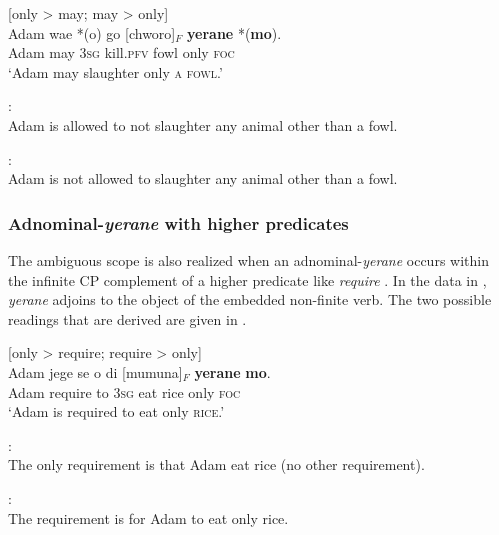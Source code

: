 \documentclass[output=paper,colorlinks,citecolor=brown,draftmode
]{langscibook}
\begin{document}
\ea	 \label{ex:Aremu:Kasem split-scope} [only > may; may > only] \\
\gll Adam wae *(o) go [chworo]$_F$ \textbf{yerane} *(\textbf{mo}).\\
	Adam may 3\textsc{sg} kill.\textsc{pfv} fowl only \textsc{foc}\\
\glt `Adam may slaughter only \textsc{a fowl}.'
\z

\ea \label{ex:Aremu:Kasem split-scope readings}
\begin{xlist}
: \\ Adam is allowed to not slaughter any animal other than a fowl.

: \\ Adam is not allowed to slaughter any animal other than a fowl.
\end{xlist}

\z

\subsubsection{Adnominal-\textit{yerane} with higher predicates}
The ambiguous scope is also realized when an adnominal-\textit{yerane} occurs within the infinite CP complement of a higher predicate like \textit{require} \citep[à la][]{taglicht1984message}. In the data in , \textit{yerane} adjoins to the object of the embedded non-finite verb. The two possible readings that are derived are given in .

\ea \label{ex:Aremu:split-scope with higher predicate} [only > require; require > only] \\
\gll Adam jege se o di [mumuna]$_F$ \textbf{yerane} \textbf{mo}.\\
	Adam require to 3\textsc{sg} eat rice only \textsc{foc}\\ 
\glt `Adam is required to eat only \textsc{rice}.'

\z

\ea \label{ex:Aremu:split-scope with higher predicate readings}
\begin{xlist}
    
: \\ The only requirement is that Adam eat rice (no other requirement).

: \\ The requirement is for Adam to eat only rice.
 
\end{xlist}
\z
\end{document}

